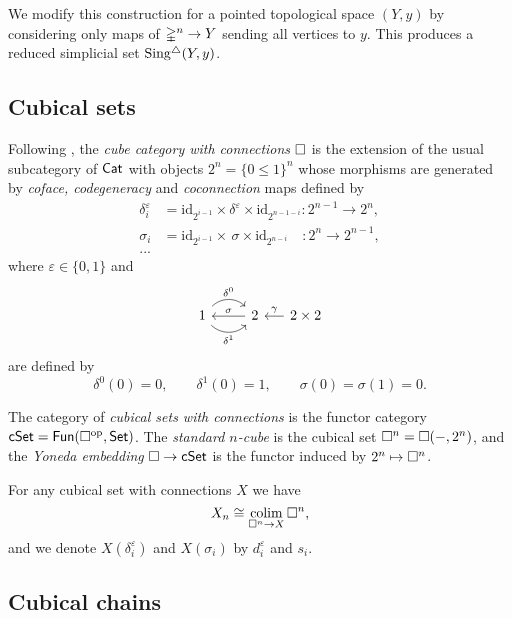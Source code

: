 We modify this construction for a pointed topological space $(Y, y)$ by considering only maps of $\mathbb{\Delta}^n \to Y$ sending all vertices to $y$.
This produces a reduced simplicial set $\operatorname{Sing^{\triangle}}(Y, y)$.

\subsection{Cubical sets}

Following \cite{brown1981cubes}, the \textit{cube category with connections} $\square$ is the extension of the usual subcategory of $\mathsf{Cat}$ with objects $2^n = \{0 \leq 1\}^n$ whose morphisms are generated by \textit{coface, codegeneracy} and \textit{coconnection} maps defined by
\begin{align*}
\delta_i^\varepsilon & = \mathrm{id}_{2^{i-1}} \times \delta^\varepsilon \times \mathrm{id}_{2^{n-1-i}} \colon 2^{n-1} \to 2^n, \\
\sigma_i & = \mathrm{id}_{2^{i-1}} \times \, \sigma \times \mathrm{id}_{2^{n-i}} \quad \colon 2^{n} \to 2^{n-1}, \\
... &
\end{align*}
where $\varepsilon \in \{0,1\}$ and
\begin{equation*}
\begin{tikzcd}
1 \arrow[r, out=45, in=135, "\delta^0"] \arrow[r, out=-45, in=-135, "\delta^1"'] & 2 \arrow[l, "\sigma"'] &[-10pt] \arrow[l, "\gamma"'] 2 \times 2
\end{tikzcd}
\end{equation*}
are defined by
\begin{equation*}
\delta^0(0) = 0, \qquad \delta^1(0) = 1, \qquad \sigma(0) = \sigma(1) = 0.
\end{equation*}

The category of \textit{cubical sets with connections} is the functor category $\mathsf{cSet} = \mathsf{Fun}(\square^{\mathrm{op}}, \mathsf{Set})$.
The \textit{standard $n$-cube} is the cubical set $\square^n = \square(-, 2^n)$, and the \textit{Yoneda embedding} $\square \to \mathsf{cSet}$ is the functor induced by $2^n \mapsto \square^n$.

For any cubical set with connections $X$ we have
\begin{equation*}
X_n \cong \operatorname*{colim}_{\square^n \to X} \square^n,
\end{equation*}
and we denote $X(\delta_i^\varepsilon)$ and $X(\sigma_i)$ by $d_i^\varepsilon$ and $s_i$.

\subsection{Cubical chains}

